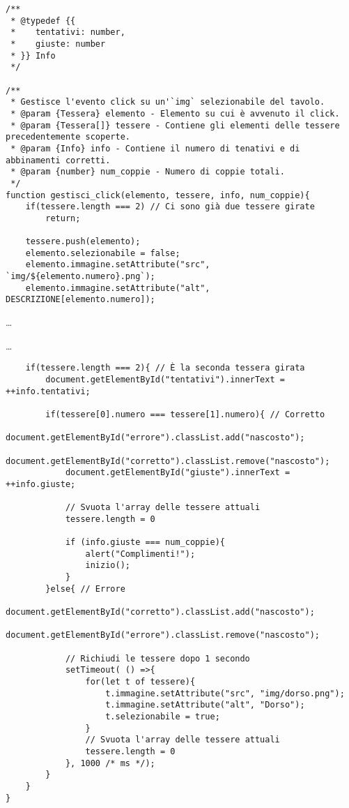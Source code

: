 \begin{frame}[fragile]\transfade
  \begin{sol}\centering
\begin{verbatim}
/**
 * @typedef {{
 *    tentativi: number,
 *    giuste: number
 * }} Info
 */

/**
 * Gestisce l'evento click su un'`img` selezionabile del tavolo.
 * @param {Tessera} elemento - Elemento su cui è avvenuto il click.
 * @param {Tessera[]} tessere - Contiene gli elementi delle tessere precedentemente scoperte.
 * @param {Info} info - Contiene il numero di tenativi e di abbinamenti corretti.
 * @param {number} num_coppie - Numero di coppie totali.
 */
function gestisci_click(elemento, tessere, info, num_coppie){
    if(tessere.length === 2) // Ci sono già due tessere girate
        return;

    tessere.push(elemento);
    elemento.selezionabile = false;
    elemento.immagine.setAttribute("src", `img/${elemento.numero}.png`);
    elemento.immagine.setAttribute("alt", DESCRIZIONE[elemento.numero]);

      \end{verbatim}
      \dots
  \end{sol}
\end{frame}
\begin{frame}[fragile]\transfade
  \begin{sol}\centering\dots
\begin{verbatim}
    if(tessere.length === 2){ // È la seconda tessera girata
        document.getElementById("tentativi").innerText = ++info.tentativi;

        if(tessere[0].numero === tessere[1].numero){ // Corretto
            document.getElementById("errore").classList.add("nascosto");
            document.getElementById("corretto").classList.remove("nascosto");
            document.getElementById("giuste").innerText = ++info.giuste;

            // Svuota l'array delle tessere attuali
            tessere.length = 0

            if (info.giuste === num_coppie){
                alert("Complimenti!");
                inizio();
            }
        }else{ // Errore
            document.getElementById("corretto").classList.add("nascosto");
            document.getElementById("errore").classList.remove("nascosto");

            // Richiudi le tessere dopo 1 secondo
            setTimeout( () =>{
                for(let t of tessere){
                    t.immagine.setAttribute("src", "img/dorso.png");
                    t.immagine.setAttribute("alt", "Dorso");
                    t.selezionabile = true;
                }
                // Svuota l'array delle tessere attuali
                tessere.length = 0
            }, 1000 /* ms */);
        }
    }
}
      \end{verbatim}
  \end{sol}
\end{frame}